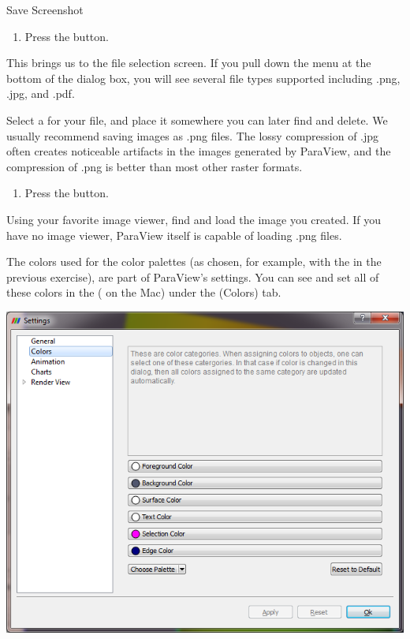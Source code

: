 \begin{exercise}{Save Screenshot}
  \begin{enumerate}
    \restorecounter
    \item Press the  button.
    \savecounter
  \end{enumerate}

  This brings us to the file selection screen.  If you pull down the menu
   at the bottom of the dialog box, you will see
  several file types supported including .png, .jpg, and .pdf.

  Select a  for your file, and place it somewhere you can
  later find and delete.  We usually recommend saving images as .png
  files.  The lossy compression of .jpg often creates noticeable artifacts
  in the images generated by ParaView, and the compression of .png is
  better than most other raster formats.

  \begin{enumerate}
    \restorecounter
    \item Press the  button.
  \end{enumerate}

  Using your favorite image viewer, find and load the image you created.
  If you have no image viewer, ParaView itself is capable of loading .png
  files.
\end{exercise}

The colors used for the color palettes (as chosen, for example, with the
 in the previous exercise), are part of
ParaView's settings.  You can see and set all of these colors in the
 \ra {} ( \ra {} on the
Mac) under the \gui(Colors) tab.
\begin{inlinefig}
  \includegraphics[width=\scw]{images/SettingsColors}
\end{inlinefig}


